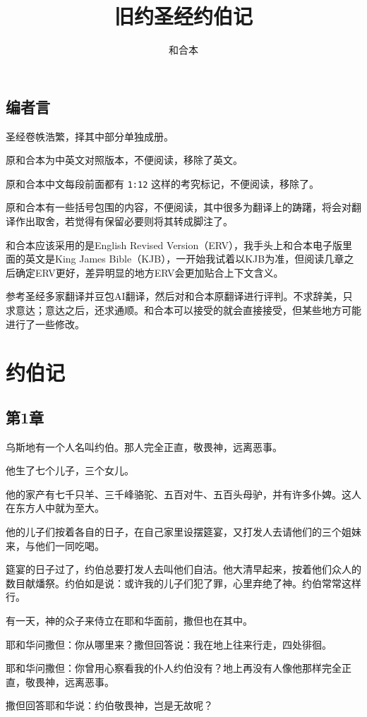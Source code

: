 \documentclass[12pt,oneside]{book}
\title{旧约圣经约伯记}
\author{和合本}
\begin{document}

\frontmatter
{}
\chapter*{编者言}
圣经卷帙浩繁，择其中部分单独成册。

原和合本为中英文对照版本，不便阅读，移除了英文。

原和合本中文每段前面都有 \verb+1:12+ 这样的考究标记，不便阅读，移除了。

原和合本有一些括号包围的内容，不便阅读，其中很多为翻译上的踌躇，将会对翻译作出取舍，若觉得有保留必要则将其转成脚注了。

和合本应该采用的是English Revised Version（ERV），我手头上和合本电子版里面的英文是King James Bible（KJB），一开始我试着以KJB为准，但阅读几章之后确定ERV更好，差异明显的地方ERV会更加贴合上下文含义。

参考圣经多家翻译并豆包AI翻译，然后对和合本原翻译进行评判。不求辞美，只求意达；意达之后，还求通顺。和合本可以接受的就会直接接受，但某些地方可能进行了一些修改。


\setcounter{tocdepth}{2}    
\tableofcontents

\mainmatter
\part{约伯记}
\chapter{第1章}
乌斯地有一个人名叫约伯。那人完全正直，敬畏神，远离恶事。

他生了七个儿子，三个女儿。

他的家产有七千只羊、三千峰骆驼、五百对牛、五百头母驴，并有许多仆婢。这人在东方人中就为至大。

他的儿子们按着各自的日子，在自己家里设摆筵宴，又打发人去请他们的三个姐妹来，与他们一同吃喝。

筵宴的日子过了，约伯总要打发人去叫他们自洁。他大清早起来，按着他们众人的数目献燔祭。约伯如是说：或许我的儿子们犯了罪，心里弃绝了神。约伯常常这样行。

有一天，神的众子来侍立在耶和华面前，撒但也在其中。

耶和华问撒但：你从哪里来？撒但回答说：我在地上往来行走，四处徘徊。

耶和华问撒但：你曾用心察看我的仆人约伯没有？地上再没有人像他那样完全正直，敬畏神，远离恶事。

撒但回答耶和华说：约伯敬畏神，岂是无故呢？
\end{document}
